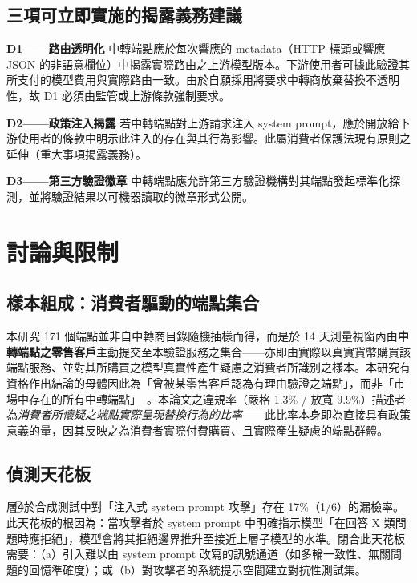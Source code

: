 \documentclass[UTF8,fontset=none,10pt,a4paper,twocolumn]{ctexart}
\begin{document}
\subsection{三項可立即實施的揭露義務建議}
\textbf{D1——路由透明化} 中轉端點應於每次響應的 metadata（HTTP 標頭或響應 JSON 的非語意欄位）中揭露實際路由之上游模型版本。下游使用者可據此驗證其所支付的模型費用與實際路由一致。由於自願採用將要求中轉商放棄替換不透明性，故 D1 必須由監管或上游條款強制要求。

\textbf{D2——政策注入揭露} 若中轉端點對上游請求注入 system prompt，應於開放給下游使用者的條款中明示此注入的存在與其行為影響。此屬消費者保護法現有原則之延伸（重大事項揭露義務）。

\textbf{D3——第三方驗證徽章} 中轉端點應允許第三方驗證機構對其端點發起標準化探測，並將驗證結果以可機器讀取的徽章形式公開。

\section{討論與限制}\label{sec:discussion}

\subsection{樣本組成：消費者驅動的端點集合}\label{sec:sample}
本研究 171 個端點並非自中轉商目錄隨機抽樣而得，而是於 14 天測量視窗內由\textbf{中轉端點之零售客戶}主動提交至本驗證服務之集合——亦即由實際以真實貨幣購買該端點服務、並對其所購買之模型真實性產生疑慮之消費者所識別之樣本。本研究有資格作出結論的母體因此為「曾被某零售客戶認為有理由驗證之端點」，而非「市場中存在的所有中轉端點」~\cite{paxson2004sound}。本論文之違規率（嚴格 1.3\% / 放寬 9.9\%）描述者為\emph{消費者所懷疑之端點實際呈現替換行為的比率}——此比率本身即為直接具有政策意義的量，因其反映之為消費者實際付費購買、且實際產生疑慮的端點群體。

\subsection{偵測天花板}\label{sec:ceiling}
層\textcircled{\scriptsize 4}於合成測試中對「注入式 system prompt 攻擊」存在 17\%（1/6）的漏檢率。此天花板的根因為：當攻擊者於 system prompt 中明確指示模型「在回答 X 類問題時應拒絕」，模型會將其拒絕邊界推升至接近上層子模型的水準。閉合此天花板需要：（a）引入難以由 system prompt 改寫的訊號通道（如多輪一致性、無關問題的回憶準確度）；或（b）對攻擊者的系統提示空間建立對抗性測試集。
\end{document}
